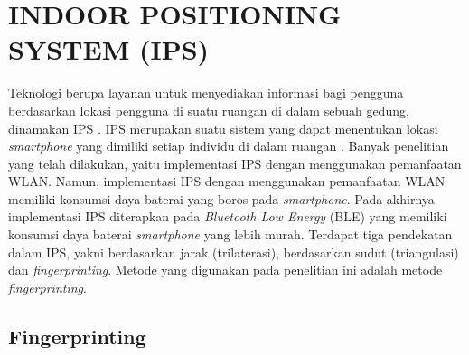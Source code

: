 \section{\uppercase{INDOOR POSITIONING SYSTEM (IPS)}}
Teknologi berupa layanan untuk menyediakan informasi bagi pengguna berdasarkan lokasi pengguna di suatu ruangan di dalam sebuah gedung, dinamakan IPS \citep{brena2017}. IPS merupakan suatu sistem yang dapat menentukan lokasi \textit{smartphone} yang dimiliki setiap individu di dalam ruangan \citep{suryanto2016}. Banyak penelitian yang telah dilakukan, yaitu implementasi IPS dengan menggunakan pemanfaatan WLAN. Namun, implementasi IPS dengan menggunakan pemanfaatan WLAN memiliki konsumsi daya baterai yang boros pada \textit{smartphone}. Pada akhirnya implementasi IPS diterapkan pada \textit{Bluetooth Low Energy }(BLE) yang memiliki konsumsi daya baterai \textit{smartphone} yang lebih murah. Terdapat tiga pendekatan dalam IPS, yakni berdasarkan jarak (trilaterasi), berdasarkan sudut (triangulasi) dan \textit{fingerprinting}. Metode yang digunakan pada penelitian ini adalah metode \textit{fingerprinting}.


\subsection{Fingerprinting}

